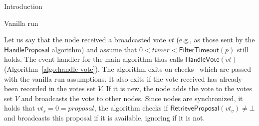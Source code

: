 \documentclass[10pt,a4paper]{article}
\begin{document}
\begin{section}{Introduction}
\begin{subsection}{Vanilla run}

Let us say that the node received a broadcasted vote $vt$ (e.g., as those sent by the $\mathsf{HandleProposal}$ 
algorithm) and assume that $0<timer<\mathsf{FilterTimeout}(p)$ still holds.
The event handler for the main algorithm thus calls $\mathsf{HandleVote}(vt)$ (Algorithm~\ref{algo:handle-vote}).
The algorithm exits on checks --which are passed with the vanilla run assumptions.
It also exits if the vote received has already been recorded in the votes set $V$.
If it is new, the node adds the vote to the votes set $V$ and broadcasts the vote 
to other nodes.
Since nodes are synchronized, it holds that $vt_s=0=proposal$, the algorithm checks if 
$\mathsf{RetrieveProposal}(vt_v) \neq \bot$ and broadcasts this proposal if it is available, ignoring if it is not.



\end{subsection}
\end{section}
\end{document}
